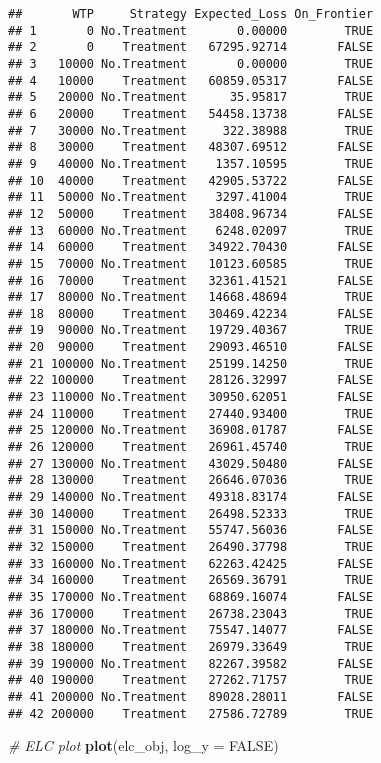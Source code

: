 \documentclass[
]{article}
\newenvironment{Shaded}{\begin{snugshade}}{\end{snugshade}}
\newcommand{\CommentTok}[1]{\textcolor[rgb]{0.56,0.35,0.01}{\textit{#1}}}
\newcommand{\DataTypeTok}[1]{\textcolor[rgb]{0.13,0.29,0.53}{#1}}
\newcommand{\KeywordTok}[1]{\textcolor[rgb]{0.13,0.29,0.53}{\textbf{#1}}}
\newcommand{\NormalTok}[1]{#1}
\newcommand{\OtherTok}[1]{\textcolor[rgb]{0.56,0.35,0.01}{#1}}
\begin{document}
\begin{verbatim}
##       WTP     Strategy Expected_Loss On_Frontier
## 1       0 No.Treatment       0.00000        TRUE
## 2       0    Treatment   67295.92714       FALSE
## 3   10000 No.Treatment       0.00000        TRUE
## 4   10000    Treatment   60859.05317       FALSE
## 5   20000 No.Treatment      35.95817        TRUE
## 6   20000    Treatment   54458.13738       FALSE
## 7   30000 No.Treatment     322.38988        TRUE
## 8   30000    Treatment   48307.69512       FALSE
## 9   40000 No.Treatment    1357.10595        TRUE
## 10  40000    Treatment   42905.53722       FALSE
## 11  50000 No.Treatment    3297.41004        TRUE
## 12  50000    Treatment   38408.96734       FALSE
## 13  60000 No.Treatment    6248.02097        TRUE
## 14  60000    Treatment   34922.70430       FALSE
## 15  70000 No.Treatment   10123.60585        TRUE
## 16  70000    Treatment   32361.41521       FALSE
## 17  80000 No.Treatment   14668.48694        TRUE
## 18  80000    Treatment   30469.42234       FALSE
## 19  90000 No.Treatment   19729.40367        TRUE
## 20  90000    Treatment   29093.46510       FALSE
## 21 100000 No.Treatment   25199.14250        TRUE
## 22 100000    Treatment   28126.32997       FALSE
## 23 110000 No.Treatment   30950.62051       FALSE
## 24 110000    Treatment   27440.93400        TRUE
## 25 120000 No.Treatment   36908.01787       FALSE
## 26 120000    Treatment   26961.45740        TRUE
## 27 130000 No.Treatment   43029.50480       FALSE
## 28 130000    Treatment   26646.07036        TRUE
## 29 140000 No.Treatment   49318.83174       FALSE
## 30 140000    Treatment   26498.52333        TRUE
## 31 150000 No.Treatment   55747.56036       FALSE
## 32 150000    Treatment   26490.37798        TRUE
## 33 160000 No.Treatment   62263.42425       FALSE
## 34 160000    Treatment   26569.36791        TRUE
## 35 170000 No.Treatment   68869.16074       FALSE
## 36 170000    Treatment   26738.23043        TRUE
## 37 180000 No.Treatment   75547.14077       FALSE
## 38 180000    Treatment   26979.33649        TRUE
## 39 190000 No.Treatment   82267.39582       FALSE
## 40 190000    Treatment   27262.71757        TRUE
## 41 200000 No.Treatment   89028.28011       FALSE
## 42 200000    Treatment   27586.72789        TRUE
\end{verbatim}

\begin{Shaded}
\begin{Highlighting}[]
\CommentTok{# ELC plot}
\KeywordTok{plot}\NormalTok{(elc_obj, }\DataTypeTok{log_y =} \OtherTok{FALSE}\NormalTok{)}
\end{Highlighting}
\end{Shaded}
\end{document}
